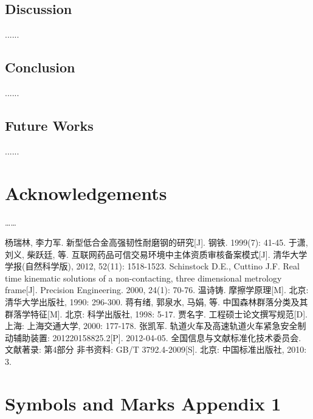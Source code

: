 \documentclass[UTF8,a4paper,12pt]{ctexart}
\numberwithin{equation}{section}
\begin{document}
\subsection{Discussion}
......

\subsection{Conclusion}
......

\subsection{Future Works}
......

\newpage
{}

\section*{Acknowledgements}

……

\newpage
{}

\renewcommand\refname{References}
\begin{thebibliography}{1}
 杨瑞林, 李力军. 新型低合金高强韧性耐磨钢的研究[J]. 钢铁. 1999(7): 41-45.
 于潇, 刘义, 柴跃廷, 等. 互联网药品可信交易环境中主体资质审核备案模式[J]. 清华大学学报(自然科学版), 2012, 52(11): 1518-1523.
 Schinstock D.E., Cuttino J.F. Real time kinematic solutions of a non-contacting, three dimensional metrology frame[J]. Precision Engineering. 2000, 24(1): 70-76. 
 温诗铸. 摩擦学原理[M]. 北京: 清华大学出版社, 1990: 296-300.
 蒋有绪, 郭泉水, 马娟, 等. 中国森林群落分类及其群落学特征[M]. 北京: 科学出版社, 1998: 5-17.
 贾名字. 工程硕士论文撰写规范[D]. 上海: 上海交通大学, 2000: 177-178.
 张凯军. 轨道火车及高速轨道火车紧急安全制动辅助装置: 201220158825.2[P]. 2012-04-05.
 全国信息与文献标准化技术委员会. 文献著录: 第4部分 非书资料: GB/T 3792.4-2009[S]. 北京: 中国标准出版社, 2010: 3.
\end{thebibliography}%

\newpage
{}

\section*{Symbols and Marks Appendix 1}
\end{document}
